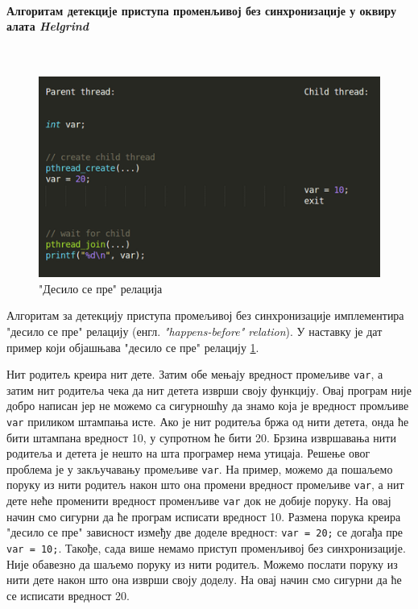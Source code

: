 \documentclass[12pt,oneside]{memoir}
\begin{document}
\paragraph{Алгоритам детекциjе приступа променљивој без синхронизације у оквиру алата \textit{Helgrind}} \mbox{}\\

\begin{figure}[h!]
\begin{center}
\includegraphics[scale=0.75]{slika16.png}
\end{center}
\caption{"Десило се пре" релација}
\label{fig:dspPrincip}
\end{figure}


\indent Алгоритам за детекцију приступа промељивој без синхронизације имплементира "десило се пре" релацију (енгл. \textit{"happens-before" relation}). У наставку је дат пример који објашњава "десило се пре" релацију \ref{fig:dspPrincip}.

\indent Нит родитељ креира нит дете. Затим обе мењају вредност промељиве \texttt{var}, а затим нит родитеља чека да нит детета изврши своју функцију. Овај програм није добро написан јер не можемо са сигурношћу да знамо која је вредност промљиве \texttt{var} приликом штампања исте. Ако је нит родитеља бржа од нити детета, онда ће бити штампана вредност 10, у супротном ће бити 20. Брзина извршавања нити родитеља и детета је нешто на шта програмер нема утицаја. Решење овог проблема је у закључавању промељиве \texttt{var}. На пример, можемо да пошаљемо поруку из нити родитељ након што она промени вредност промељиве \texttt{var}, а нит дете неће променити вредност променљиве \texttt{var} док не добије поруку. На овај начин смо сигурни  да ће програм исписати вредност 10. Размена порука креира "десило се пре" зависност између две доделе вредност: \texttt{var = 20;} се догађа пре \texttt{var = 10;}. Такође, сада више немамо приступ променљивој без синхронизације. Није обавезно да шаљемо поруку из нити родитељ. Можемо послати поруку из нити дете након што она изврши своју доделу. На овај начин смо сигурни да ће се исписати вредност 20.
\end{document}
